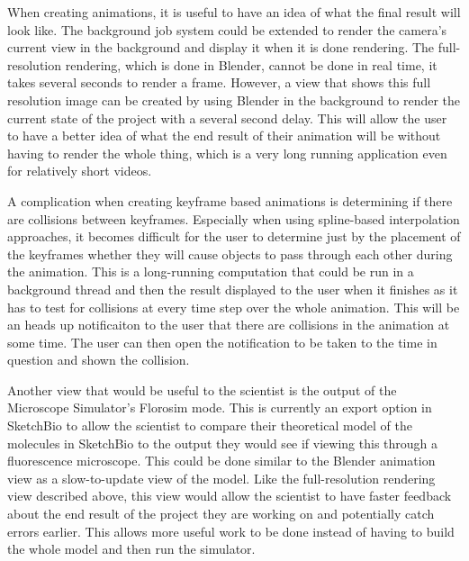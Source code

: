 \documentclass{article} %
\begin{document}
When creating animations, it is useful to have an idea of what the final result will look like.  The background job system could be extended to render the camera's current view in the background and display it when it is done rendering.  The full-resolution rendering, which is done in Blender, cannot be done in real time, it takes several seconds to render a frame.  However, a view that shows this full resolution image can be created by using Blender in the background to render the current state of the project with a several second delay.  This will allow the user to have a better idea of what the end result of their animation will be without having to render the whole thing, which is a very long running application even for relatively short videos.

A complication when creating keyframe based animations is determining if there are collisions between keyframes.  Especially when using spline-based interpolation approaches, it becomes difficult for the user to determine just by the placement of the keyframes whether they will cause objects to pass through each other during the animation.  This is a long-running computation that could be run in a background thread and then the result displayed to the user when it finishes as it has to test for collisions at every time step over the whole animation.  This will be an heads up notificaiton to the user that there are collisions in the animation at some time.  The user can then open the notification to be taken to the time in question and shown the collision.

Another view that would be useful to the scientist is the output of the Microscope Simulator's Florosim mode.  This is currently an export option in SketchBio to allow the scientist to compare their theoretical model of the molecules in SketchBio to the output they would see if viewing this through a fluorescence microscope.  This could be done similar to the Blender animation view as a slow-to-update view of the model.  Like the full-resolution rendering view described above, this view would allow the scientist to have faster feedback about the end result of the project they are working on and potentially catch errors earlier.  This allows more useful work to be done instead of having to build the whole model and then run the simulator.
\end{document}
